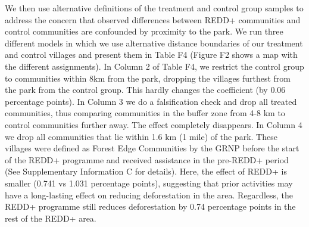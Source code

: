 \documentclass[
]{article}
\begin{document}
We then use alternative definitions of the treatment and control group
samples to address the concern that observed differences between REDD+
communities and control communities are confounded by proximity to the
park. We run three different models in which we use alternative distance
boundaries of our treatment and control villages and present them in
Table F4 (Figure F2 shows a map with the different assignments). In
Column 2 of Table F4, we restrict the control group to communities
within 8km from the park, dropping the villages furthest from the park
from the control group. This hardly changes the coefficient (by 0.06
percentage points). In Column 3 we do a falsification check and drop all
treated communities, thus comparing communities in the buffer zone from
4-8 km to control communities further away. The effect completely
disappears. In Column 4 we drop all communities that lie within 1.6 km
(1 mile) of the park. These villages were defined as Forest Edge
Communities by the GRNP before the start of the REDD+ programme and
received assistance in the pre-REDD+ period (See Supplementary
Information C for details). Here, the effect of REDD+ is smaller (0.741
vs 1.031 percentage points), suggesting that prior activities may have a
long-lasting effect on reducing deforestation in the area. Regardless,
the REDD+ programme still reduces deforestation by 0.74 percentage
points in the rest of the REDD+ area.
\end{document}
